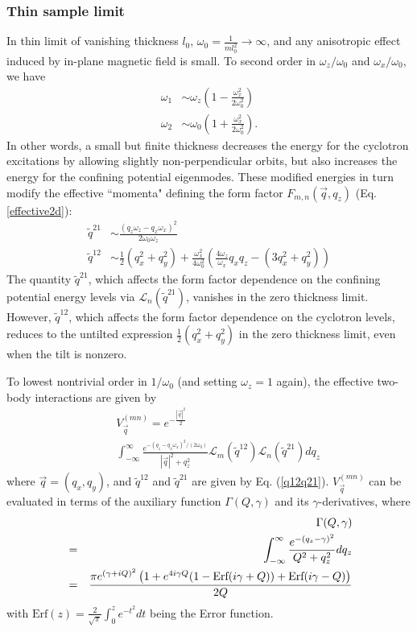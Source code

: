 \documentclass[twocolumn,showpacs,amsmath,amstex,amssymb,mathfonts,prb]{revtex4-1}
\begin{document}
\subsubsection{Thin sample limit}

In thin limit of vanishing thickness $l_0$, $\omega_0=\frac1{ml_0^2}\rightarrow \infty$, and any anisotropic effect induced by in-plane magnetic field is small. To second order in $\omega_z/\omega_0$ and $\omega_x/\omega_0$, we have
\begin{align}
\omega_1&\sim \omega_z\left(1-\frac{\omega_x^2}{2\omega_0^2}\right)\\
\omega_2&\sim \omega_0\left(1+\frac{\omega_x^2}{2\omega_0^2}\right).
\end{align}
In other words, a small but finite thickness decreases the energy for the cyclotron excitations by allowing slightly non-perpendicular orbits, but also increases the energy for the confining potential eigenmodes. 
These modified energies in turn modify the effective ``momenta" defining the form factor $F_{m,n}(\vec q,q_z)$ (Eq. \ref{effective2d}):
\begin{align}
\tilde q^{21}&\sim \frac{(q_z\omega_z-q_x\omega_x)^2}{2\omega_0\omega_z}\\
\tilde q^{12}&\sim \frac1{2}(q_x^2+q_y^2)+\frac{\omega_x^2}{4\omega_0^2}\left(\frac{4\omega_z}{\omega_x}q_xq_z-(3q_x^2+q_y^2)\right)
\label{q12q21}
\end{align}
The quantity $\tilde q^{21}$, which affects the form factor dependence on the confining potential energy levels via $\mathcal L_n\left(\tilde q^{21}\right)$, vanishes in the zero thickness limit. However, $\tilde q^{12}$, which affects the form factor dependence on the cyclotron levels, reduces to the untilted expression $\frac1{2}(q_x^2+q_y^2)$ in the zero thickness limit, even when the tilt is nonzero.

To lowest nontrivial order in $1/\omega_0$ (and setting $\omega_z=1$ again), the effective two-body interactions are given by
\begin{eqnarray}
& &V^{(mn)}_{\vec q} = e^{-\frac{|\vec q|^2}{2}} \nonumber \\
           & &\int_{-\infty}^\infty \frac{e^{-(q_z-q_x\omega_x)^2/(2\omega_0)}}{|\vec q|^2+q_z^2}\mathcal L_m\left(\tilde q^{12}\right)\mathcal L_n\left(\tilde q^{21}\right)dq_z
\label{Vmnomega_0}
\end{eqnarray}
where $\vec q=(q_x,q_y)$, and $\tilde q^{12}$ and $\tilde q^{21}$ are given by Eq. (\ref{q12q21}). $V^{(mn)}_{\vec q}$ can be evaluated in terms of the auxiliary function $\Gamma(Q,\gamma)$ and its $\gamma$-derivatives, where
\begin{eqnarray}
&&\Gamma(Q,\gamma)\notag\\
&=& \int_{-\infty}^\infty \frac{e^{-(q_z-\gamma)^2}}{Q^2+q_z^2}dq_z\notag\\
&=&\frac{\pi e^{(\gamma+iQ)^2}\left(1+e^{4i\gamma Q}(1-\text{Erf}(i\gamma+Q))+ \text{Erf}(i\gamma-Q)\right)}{2Q}\notag\\
\label{Gamma}
\end{eqnarray}
with $\text{Erf}(z)=\frac{2}{\sqrt{\pi}}\int_0^ze^{-t^2}dt$ being the Error function. 
\end{document}
